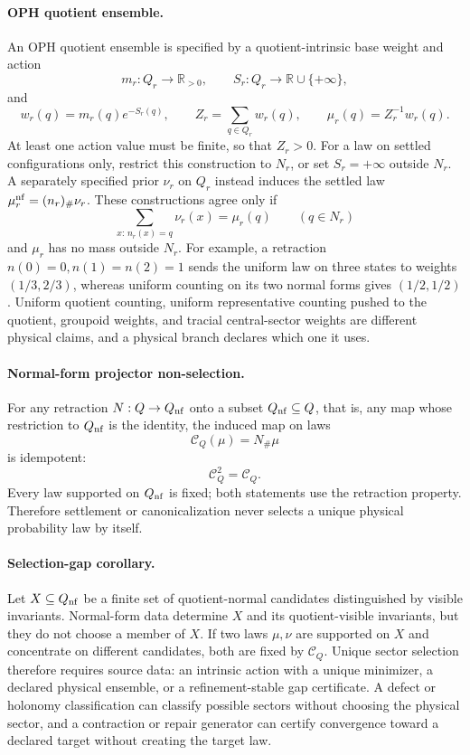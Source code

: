 \paragraph{OPH quotient ensemble.}
An OPH quotient ensemble is specified by a quotient-intrinsic base weight and action
\[
m_r:Q_r\to \mathbb R_{>0},
\qquad
S_r:Q_r\to \mathbb R\cup\{+\infty\},
\]
and
\[
w_r(q)=m_r(q)e^{-S_r(q)},\qquad
Z_r=\sum_{q\in Q_r}w_r(q),\qquad
\mu_r(q)=Z_r^{-1}w_r(q).
\]
At least one action value must be finite, so that \(Z_r>0\).
For a law on settled configurations only, restrict this construction to
\(N_r\), or set \(S_r=+\infty\) outside \(N_r\).
A separately specified prior \(\nu_r\) on \(Q_r\) instead induces the settled
law \(\mu_r^{\rm nf}=(n_r)_\#\nu_r\). These constructions agree only if
\[
 \sum_{x:\,n_r(x)=q}\nu_r(x)=\mu_r(q)\qquad(q\in N_r)
\]
and \(\mu_r\) has no mass outside \(N_r\). For example, a retraction
\(n(0)=0,n(1)=n(2)=1\) sends the uniform law on three states to weights
\((1/3,2/3)\), whereas uniform counting on its two normal forms gives
\((1/2,1/2)\). Uniform quotient counting, uniform representative counting
pushed to the quotient, groupoid weights, and tracial central-sector weights
are different physical claims, and a physical branch declares which one it uses.

\paragraph{Normal-form projector non-selection.}
For any retraction \(N:Q\to Q_{\rm nf}\) onto a subset \(Q_{\rm nf}\subseteq Q\), that is, any map
whose restriction to \(Q_{\rm nf}\) is the identity, the induced map on laws
\[
\mathcal C_Q(\mu)=N_\#\mu
\]
is idempotent:
\[
\mathcal C_Q^2=\mathcal C_Q.
\]
Every law supported on \(Q_{\rm nf}\) is fixed; both statements use the retraction property.  Therefore settlement or canonicalization never
selects a unique physical probability law by itself.

\paragraph{Selection-gap corollary.}
Let \(X\subseteq Q_{\rm nf}\) be a finite set of quotient-normal candidates distinguished by
visible invariants.  Normal-form data determine \(X\) and its quotient-visible invariants, but they
do not choose a member of \(X\).  If two laws \(\mu,\nu\) are supported on \(X\) and concentrate on
different candidates, both are fixed by \(\mathcal C_Q\).  Unique sector selection therefore
requires source data: an intrinsic action with a unique minimizer, a declared physical ensemble, or
a refinement-stable gap certificate.  A defect or holonomy classification can classify possible
sectors without choosing the physical sector, and a contraction or repair generator can certify
convergence toward a declared target without creating the target law.

